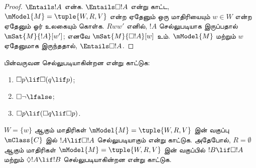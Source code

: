 \documentclass[../../../include/open-logic-section]{subfiles}
\begin{document}
\begin{proof}
  $\Entails !A$ என்க. $\Entails \Box!A$ என்று காட்ட, $\mModel{M} =
  \tuple{W, R, V}$ என்ற ஏதேனும் ஒரு மாதிரியையும் $w \in W$ என்ற ஏதேனும்
  ஓர் உலகையும் கொள்க. $Rww'$ எனில், $!A$ செல்லுபடியாக இருப்பதால்
  $\mSat{M}{!A}[w']$; எனவே $\mSat{M}{\Box!A}[w]$ உம். $\mModel{M}$ மற்றும்
  $w$ ஏதேனுமாக இருந்ததால், $\Entails \Box!A$.
\end{proof}

\begin{prob}
  பின்வருவன செல்லுபடியாகின்றன என்று காட்டுக:
  \begin{enumerate}
  \item $\Box p \lif \Box (q \lif p)$;
  \item $\Box \lnot \lfalse$;
  \item $\Box p \lif (\Box q \lif \Box p)$.
  \end{enumerate}
\end{prob}

\begin{prob}
  $W = \{w\}$ ஆகும் மாதிரிகள் $\mModel{M} = \tuple{W, R, V}$ இன் வகுப்பு
  $\mClass{C}$ இல் $!A \lif \Box!A$ செல்லுபடியாகும் என்று காட்டுக.
  அதேபோல், $R = \emptyset$ ஆகும் மாதிரிகள் $\mModel{M} = \tuple{W, R,
  V}$ இன் வகுப்பில் $!B \lif \Box !A$ மற்றும் $\Diamond !A \lif !B$
  செல்லுபடியாகின்றன என்று காட்டுக.
\end{prob}
\end{document}
